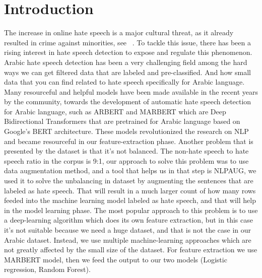 \documentclass[conference]{IEEEtran}
\begin{document}
\section{Introduction}
The increase in online hate speech is a major cultural threat, as it already resulted in crime against minorities, see ~\cite{hate2022machine}. To tackle this issue, there has been a rising interest in hate speech detection to expose and regulate this phenomenon. Arabic hate speech detection has been a very challenging field among the hard ways we can get filtered data that are labeled and pre-classified. And how small data that you can find related to hate speech specifically for Arabic language.
Many resourceful and helpful models have been made available in the recent years by the community, towards the development of automatic hate speech detection for Arabic language, such as ARBERT and MARBERT which are Deep Bidirectional Transformers that are pretrained for Arabic language based on Google's BERT architecture. These models revolutionized the research on NLP and became resourceful in our feature-extraction phase. 
Another problem that is presented by the dataset is that it’s not balanced. The non-hate speech to hate speech ratio in the corpus is 9:1, our approach to solve this problem was to use data augmentation method, and a tool that helps us in that step is NLPAUG, we used it to solve the unbalancing in dataset by augmenting the sentences that are labeled as hate speech. That will result in a much larger count of how many rows feeded into the machine learning model labeled as hate speech, and that will help in the model learning phase.
The most popular approach to this problem is to use a deep-learning algorithm which does its own feature extraction, but in this case it’s not suitable because we need a huge dataset, and that is not the case in our Arabic dataset. Instead, we use multiple machine-learning approaches which are not greatly affected by the small size of the dataset. For feature extraction we use MARBERT model, then we feed the output to our two models (Logistic regression, Random Forest).
\end{document}
